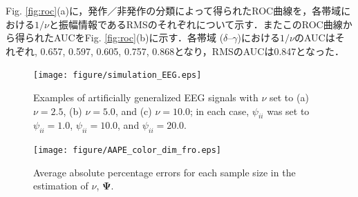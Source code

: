 \documentclass[journal]{IEEEtran}
\begin{document}
Fig. \ref{fig:roc}(a)に，発作／非発作の分類によって得られたROC曲線を，各帯域における$1/\nu$と振幅情報であるRMSのそれぞれについて示す．またこのROC曲線から得られたAUCをFig. \ref{fig:roc}(b)に示す．各帯域 ($\delta$--$\gamma$)における$1/\nu$のAUCはそれぞれ, 0.657, 0.597, 0.605, 0.757, 0.868となり，RMSのAUCは0.847となった．
\begin{figure}[!t]
\centering
\texttt{[image: figure/simulation\_EEG.eps]}
\caption{Examples of artificially generalized EEG signals with $\nu$ set to (a) $\nu = 2.5$, (b) $\nu = 5.0$, and (c) $\nu = 10.0$; in each case, ${\psi_{ii}}$ was set to ${\psi_{ii}} = 1.0$, ${\psi_{ii}} = 10.0$, and ${\psi_{ii}} = 20.0$.}
\label{fig:sim_EEG}
\end{figure}

\begin{figure}[!t]
\centering
\texttt{[image: figure/AAPE\_color\_dim\_fro.eps]}
\caption{Average absolute percentage errors for each sample size in the estimation of $\nu$, $\mathbf{\Psi}$.}
\label{fig:ES_param}
\end{figure}
\end{document}
